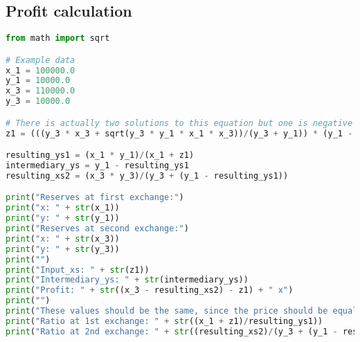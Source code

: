 \subsection{Profit calculation}
\label{code:pyProf}
\begin{lstlisting}[language=python]
from math import sqrt

# Example data
x_1 = 100000.0
y_1 = 10000.0
x_3 = 110000.0
y_3 = 10000.0

# There is actually two solutions to this equation but one is negative so we have not included it here
z1 = (((y_3 * x_3 + sqrt(y_3 * y_1 * x_1 * x_3))/(y_3 + y_1)) * (y_1 - ((sqrt(x_1) * sqrt(y_1) * sqrt(x_1 * y_1 + 4 * ((y_3 * x_3 + sqrt(y_3 * y_1 * x_1 * x_3))/(y_3 + y_1)) * (y_1 + y_3)) - x_1 * y_1)/(2 * ((y_3 * x_3 + sqrt(y_3 * y_1 * x_1 * x_3))/(y_3 + y_1))))) * ((sqrt(x_1) * sqrt(y_1) * sqrt(x_1 * y_1 + 4 * ((y_3 * x_3 + sqrt(y_3 * y_1 * x_1 * x_3))/(y_3 + y_1)) * (y_1 + y_3)) - x_1 * y_1)/(2 * ((y_3 * x_3 + sqrt(y_3 * y_1 * x_1 * x_3))/(y_3 + y_1)))))/(y_1 * (y_1 - ((sqrt(x_1) * sqrt(y_1) * sqrt(x_1 * y_1 + 4 * ((y_3 * x_3 + sqrt(y_3 * y_1 * x_1 * x_3))/(y_3 + y_1)) * (y_1 + y_3)) - x_1 * y_1)/(2 * ((y_3 * x_3 + sqrt(y_3 * y_1 * x_1 * x_3))/(y_3 + y_1)))) + y_3))

resulting_ys1 = (x_1 * y_1)/(x_1 + z1)
intermediary_ys = y_1 - resulting_ys1
resulting_xs2 = (x_3 * y_3)/(y_3 + (y_1 - resulting_ys1))

print("Reserves at first exchange:")
print("x: " + str(x_1))
print("y: " + str(y_1))
print("Reserves at second exchange:")
print("x: " + str(x_3))
print("y: " + str(y_3))
print("")
print("Input_xs: " + str(z1))
print("Intermediary_ys: " + str(intermediary_ys))
print("Profit: " + str((x_3 - resulting_xs2) - z1) + " x")
print("")
print("These values should be the same, since the price should be equal afterwards:")
print("Ratio at 1st exchange: " + str((x_1 + z1)/resulting_ys1))
print("Ratio at 2nd exchange: " + str((resulting_xs2)/(y_3 + (y_1 - resulting_ys1))))
\end{lstlisting}